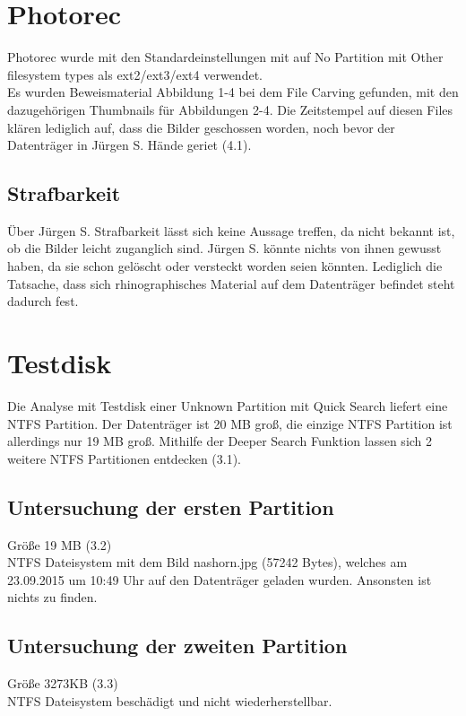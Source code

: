 \section{Photorec}
Photorec wurde mit den Standardeinstellungen mit auf No Partition mit Other filesystem types als ext2/ext3/ext4  verwendet.\\
Es wurden Beweismaterial Abbildung 1-4 bei dem File Carving gefunden, mit den dazugehörigen Thumbnails für Abbildungen 2-4. Die Zeitstempel auf diesen Files klären lediglich auf, dass die Bilder geschossen worden, noch bevor der Datenträger in Jürgen S. Hände geriet (4.1). 

\subsection{Strafbarkeit}
Über Jürgen S. Strafbarkeit lässt sich keine Aussage treffen, da nicht bekannt ist, ob die Bilder leicht zuganglich sind. Jürgen S. könnte nichts von ihnen gewusst haben, da sie schon gelöscht oder versteckt worden seien könnten. Lediglich die Tatsache, dass sich rhinographisches Material auf dem Datenträger befindet steht dadurch fest.

\section{Testdisk}

Die Analyse mit Testdisk einer Unknown Partition mit Quick Search liefert eine NTFS Partition. Der Datenträger ist 20 MB groß, die einzige NTFS Partition ist allerdings nur 19 MB groß. Mithilfe der Deeper Search Funktion lassen sich 2 weitere NTFS Partitionen entdecken (3.1). 

\subsection{Untersuchung der ersten Partition}
Größe 19 MB (3.2)\\
NTFS Dateisystem mit dem Bild nashorn.jpg (57242 Bytes), welches am 23.09.2015 um 10:49 Uhr auf den Datenträger geladen wurden.
Ansonsten ist nichts zu finden.

\subsection{Untersuchung der zweiten Partition}
Größe 3273KB (3.3)\\
NTFS Dateisystem beschädigt und nicht wiederherstellbar.

